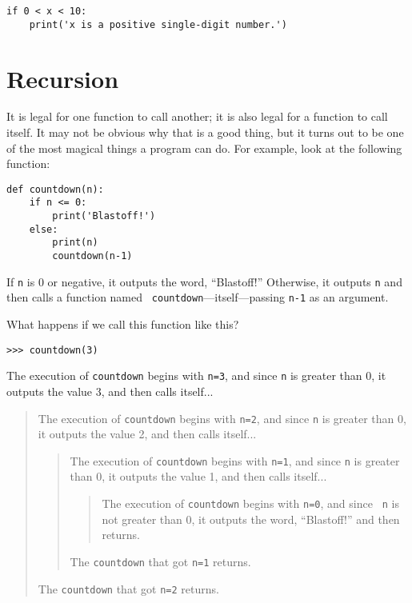 \begin{verbatim}
if 0 < x < 10:
    print('x is a positive single-digit number.')
\end{verbatim}


\section{Recursion}
\label{recursion}

It is legal for one function to call another;
it is also legal for a function to call itself.  It may not be obvious
why that is a good thing, but it turns out to be one of the most
magical things a program can do.
For example, look at the following function:

\begin{verbatim}
def countdown(n):
    if n <= 0:
        print('Blastoff!')
    else:
        print(n)
        countdown(n-1)
\end{verbatim}
%
If {\tt n} is 0 or negative, it outputs the word, ``Blastoff!''
Otherwise, it outputs {\tt n} and then calls a function named {\tt
countdown}---itself---passing {\tt n-1} as an argument.

What happens if we call this function like this?

\begin{verbatim}
>>> countdown(3)
\end{verbatim}
%
The execution of {\tt countdown} begins with {\tt n=3}, and since
{\tt n} is greater than 0, it outputs the value 3, and then calls itself...

\begin{quote}
The execution of {\tt countdown} begins with {\tt n=2}, and since
{\tt n} is greater than 0, it outputs the value 2, and then calls itself...

\begin{quote}
The execution of {\tt countdown} begins with {\tt n=1}, and since
{\tt n} is greater than 0, it outputs the value 1, and then calls itself...

\begin{quote}
The execution of {\tt countdown} begins with {\tt n=0}, and since {\tt
n} is not greater than 0, it outputs the word, ``Blastoff!'' and then
returns.
\end{quote}

The {\tt countdown} that got {\tt n=1} returns.
\end{quote}

The {\tt countdown} that got {\tt n=2} returns.
\end{quote}


